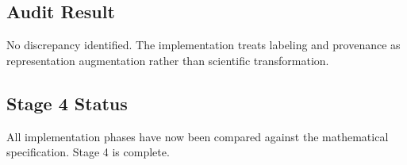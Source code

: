 \subsection{Audit Result}

No discrepancy identified. The implementation treats labeling and
provenance as representation augmentation rather than scientific
transformation.

\subsection{Stage 4 Status}

All implementation phases have now been compared against the
mathematical specification. Stage 4 is complete.
